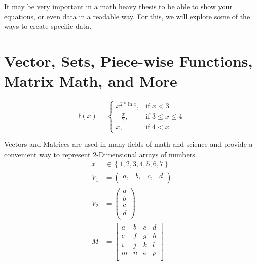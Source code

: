 	It may be very important in a math heavy thesis to be able to show your equations, or even data in a readable way. 
	For this, we will explore some of the ways to create specific data.

	\section{Vector, Sets, Piece-wise Functions, Matrix Math, and More}
		\begin{equation}
			\text{f}(x) = 
				\begin{cases}
					x^{2*\ln{x}},&\text{if }x<3\\
					-\frac{x}{2},&\text{if }3\leq{}x\leq{}4\\
					x,&\text{if }4<x
				\end{cases}
		\end{equation}
	
		Vectors and Matrices are used in many fields of math and science and provide a convenient way to represent 2-Dimensional arrays of numbers.
		\begin{align}
			x&\in{}\left\{1,2,3,4,5,6,7\right\}\\
			V_{1} &= {\left(
			\begin{array}{cccc}
				a, & b, & c, & d\\
			\end{array}
			\right)}\\
			V_{2} &= \left(
			\begin{array}{c}
				a \\
				b \\
				c \\
				d \\
			\end{array}
			\right)\\
			M &= {\left[
			\begin{array}{cccc}
				a & b & c & d\\
				e & f & g & h\\
				i & j & k & l\\
				m & n & o & p\\
			\end{array}
			\right]}
		\end{align}